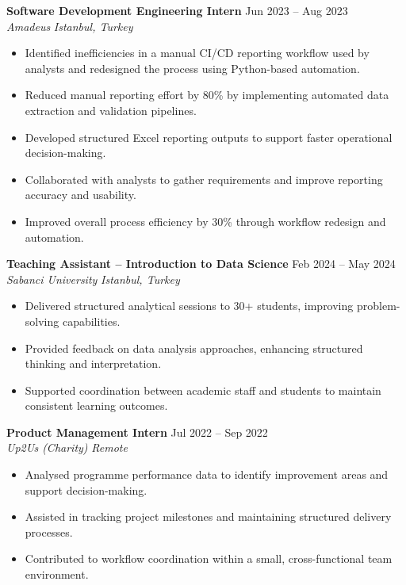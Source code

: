 \documentclass[11pt, a4paper]{article}
\newcommand{\entry}[4]{
  \noindent\textbf{#1} \hfill {\footnotesize #2} \\
  \textit{#3} \hfill \textit{#4}
  \vspace{4pt}
}
\begin{document}
\vspace{6pt}

\entry{Software Development Engineering Intern}{Jun 2023 -- Aug 2023}
{Amadeus}{Istanbul, Turkey}

\begin{itemize}[noitemsep, topsep=0pt, leftmargin=1.5em]
    \item Identified inefficiencies in a manual CI/CD reporting workflow used by analysts and redesigned the process using Python-based automation.
    \item Reduced manual reporting effort by 80\% by implementing automated data extraction and validation pipelines.
    \item Developed structured Excel reporting outputs to support faster operational decision-making.
    \item Collaborated with analysts to gather requirements and improve reporting accuracy and usability.
    \item Improved overall process efficiency by 30\% through workflow redesign and automation.
\end{itemize}

\vspace{6pt}

\entry{Teaching Assistant -- Introduction to Data Science}{Feb 2024 -- May 2024}
{Sabanci University}{Istanbul, Turkey}

\begin{itemize}[noitemsep, topsep=0pt, leftmargin=1.5em]
    \item Delivered structured analytical sessions to 30+ students, improving problem-solving capabilities.
    \item Provided feedback on data analysis approaches, enhancing structured thinking and interpretation.
    \item Supported coordination between academic staff and students to maintain consistent learning outcomes.
\end{itemize}

\vspace{6pt}

\entry{Product Management Intern}{Jul 2022 -- Sep 2022}
{Up2Us (Charity)}{Remote}

\begin{itemize}[noitemsep, topsep=0pt, leftmargin=1.5em]
    \item Analysed programme performance data to identify improvement areas and support decision-making.
    \item Assisted in tracking project milestones and maintaining structured delivery processes.
    \item Contributed to workflow coordination within a small, cross-functional team environment.
\end{itemize}
\end{document}
